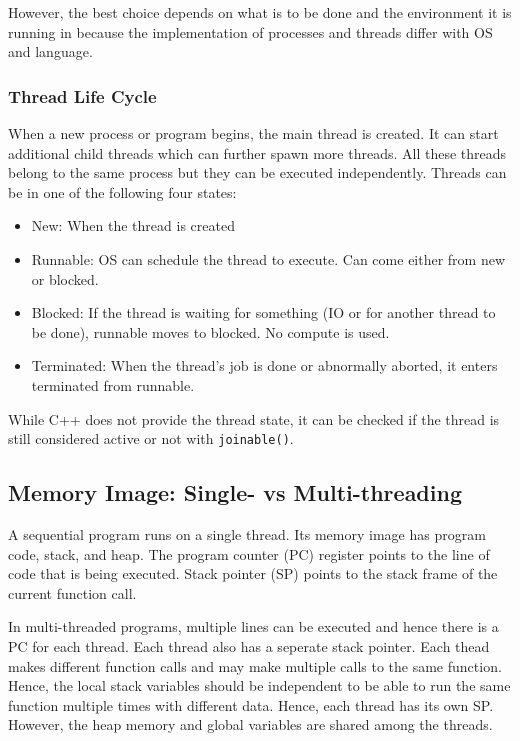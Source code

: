 \documentclass{scrartcl}
\begin{document}
However, the best choice depends on what is to be done and the environment it is running in because the implementation of processes and threads differ with OS and language.

\subsubsection{Thread Life Cycle}
When a new process or program begins, the main thread is created. It can start additional child threads which can further spawn more threads. All these threads belong to the same process but they can be executed independently. Threads can be in one of the following four states:

\begin{itemize}
    \item New: When the thread is created
    \item Runnable: OS can schedule the thread to execute. Can come either from new or blocked.
    \item Blocked: If the thread is waiting for something (IO or for another thread to be done), runnable moves to blocked. No compute is used.
    \item Terminated: When the thread's job is done or abnormally aborted, it enters terminated from runnable. 
\end{itemize}

While C++ does not provide the thread state, it can be checked if the thread is still considered active or not with \texttt{joinable()}.

\subsection{Memory Image: Single- vs Multi-threading}
A sequential program runs on a single thread. Its memory image has program code, stack, and heap. The program counter (PC) register points to the line of code that is being executed. Stack pointer (SP) points to the stack frame of the current function call. 

In multi-threaded programs, multiple lines can be executed and hence there is a PC for each thread. Each thread also has a seperate stack pointer. Each thead makes different function calls and may make multiple calls to the same function. Hence, the local stack variables should be independent to be able to run the same function multiple times with different data. Hence, each thread has its own SP. However, the heap memory and global variables are shared among the threads.
\end{document}
